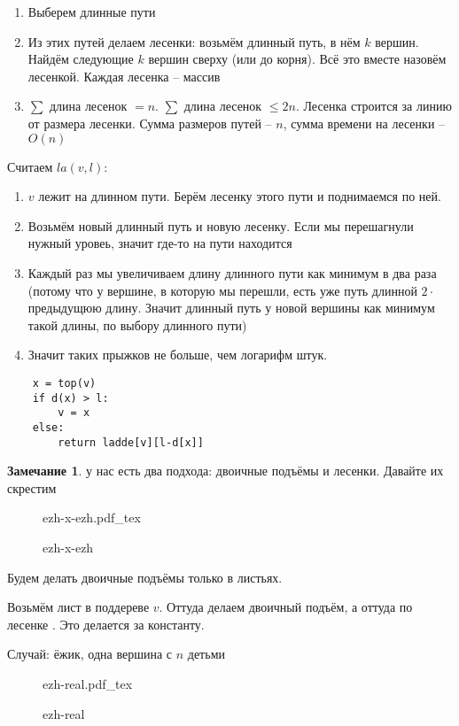 \documentclass{book}
\theoremstyle{definition}
\newtheorem*{note}{Замечание}
\newcommand{\incfig}[1]{%
    \def\svgwidth{\columnwidth}
    {#1.pdf_tex}
}
\begin{document}
\begin{enumerate}
    \item Выберем длинные пути
    \item Из этих путей делаем лесенки: возьмём длинный путь, в нём $k$ вершин. Найдём следующие  $k$ вершин сверху (или до корня). Всё это вместе назовём лесенкой. Каждая лесенка -- массив
    \item  $\sum$ длина лесенок $=n$.  $\sum$ длина лесенок  $\leqslant 2n$. Лесенка строится за линию от размера лесенки. Сумма размеров путей -- $n$, сумма времени на лесенки --  $O(n)$
\end{enumerate}

Считаем $la(v,l)$:
 \begin{enumerate}
    \item $v$ лежит на длинном пути. Берём лесенку этого пути и поднимаемся по ней. 
    \item Возьмём новый длинный путь и новую лесенку. Если мы перешагнули нужный уровеь, значит где-то на пути находится 
    \item Каждый раз мы увеличиваем длину длинного пути как минимум в два раза (потому что у вершине, в которую мы перешли, есть уже путь длинной $2 \cdot  $ предыдущюю длину. Значит длинный путь у новой вершины как минимум такой длины, по выбору длинного пути)
    \item Значит таких прыжков не больше, чем логарифм штук.
\end{enumerate}

\begin{lstlisting}
    x = top(v)
    if d(x) > l:
        v = x
    else:
        return ladde[v][l-d[x]]
\end{lstlisting}    

\begin{note}
    у нас есть два подхода: двоичные подъёмы и лесенки. Давайте их скрестим
\end{note}

\begin{figure}[!ht]
    \centering
    \incfig{ezh-x-ezh}
    \caption{ezh-x-ezh}
    \label{fig:ezh-x-ezh}
\end{figure}

Будем делать двоичные подъёмы только в листьях.

Возьмём лист в поддереве $v$. Оттуда делаем двоичный подъём, а оттуда по лесенке . Это делается за константу.

Случай: ёжик, одна вершина с  $n$ детьми

\begin{figure}[!ht]
    \centering
    \incfig{ezh-real}
    \caption{ezh-real}
    \label{fig:ezh-real}
\end{figure}
\end{document}
